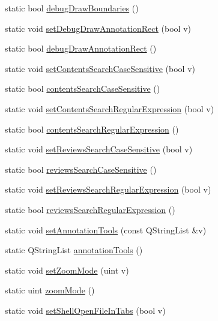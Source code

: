 \begin{DoxyCompactItemize}
\item 
static bool \hyperlink{classOkular_1_1Settings_a2e83859c60c6438d9b22868d5ed33822}{debug\+Draw\+Boundaries} ()
\item 
static void \hyperlink{classOkular_1_1Settings_afbf0e30264a1c6480b634824a9b86ead}{set\+Debug\+Draw\+Annotation\+Rect} (bool v)
\item 
static bool \hyperlink{classOkular_1_1Settings_ae3bab7094b103959c1dc2733cf324d8d}{debug\+Draw\+Annotation\+Rect} ()
\item 
static void \hyperlink{classOkular_1_1Settings_a17797652640f83f825633cffbf8f811e}{set\+Contents\+Search\+Case\+Sensitive} (bool v)
\item 
static bool \hyperlink{classOkular_1_1Settings_a765b61b1e747150cbafbb172f1ae7cc6}{contents\+Search\+Case\+Sensitive} ()
\item 
static void \hyperlink{classOkular_1_1Settings_ae5ab024658f3ceb33bf59a6a03336f27}{set\+Contents\+Search\+Regular\+Expression} (bool v)
\item 
static bool \hyperlink{classOkular_1_1Settings_a4538569f7bba12fd4132e285d3dfa836}{contents\+Search\+Regular\+Expression} ()
\item 
static void \hyperlink{classOkular_1_1Settings_a4ecc4f960370f11898d272ce1b8d16f9}{set\+Reviews\+Search\+Case\+Sensitive} (bool v)
\item 
static bool \hyperlink{classOkular_1_1Settings_adbb13003c81b59324a4d6179fc6508e9}{reviews\+Search\+Case\+Sensitive} ()
\item 
static void \hyperlink{classOkular_1_1Settings_acf6054365a75085ffc7cb5b528993b8c}{set\+Reviews\+Search\+Regular\+Expression} (bool v)
\item 
static bool \hyperlink{classOkular_1_1Settings_a699e1714e8e28124d244d025f1d55076}{reviews\+Search\+Regular\+Expression} ()
\item 
static void \hyperlink{classOkular_1_1Settings_ada85893e9fb5ca35bb993c230acf0949}{set\+Annotation\+Tools} (const Q\+String\+List \&v)
\item 
static Q\+String\+List \hyperlink{classOkular_1_1Settings_a7de11e31971faa4b6e888169c7b1e7cc}{annotation\+Tools} ()
\item 
static void \hyperlink{classOkular_1_1Settings_a43990bdea256ab89e6fb6621c82755f7}{set\+Zoom\+Mode} (uint v)
\item 
static uint \hyperlink{classOkular_1_1Settings_ac7d5497a44639957ba8876d05f45d11f}{zoom\+Mode} ()
\item 
static void \hyperlink{classOkular_1_1Settings_a45617c5adfab09a690beb3faabf15a4a}{set\+Shell\+Open\+File\+In\+Tabs} (bool v)

\end{DoxyCompactItemize}
